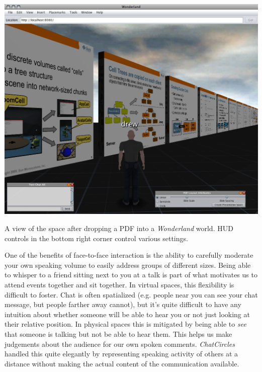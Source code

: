 \begin{marginfigure}[1.0in]
	\includegraphics{figures/pdf-spreader.png}
	\caption{A view of the space after dropping a PDF into a \emph{Wonderland} world. HUD controls in the bottom right corner control various settings.}
	\label{fig:pdf_spreader}
\end{marginfigure}

One of the benefits of face-to-face interaction is the ability to carefully moderate your own speaking volume to easily address groups of different sizes. Being able to whisper to a friend sitting next to you at a talk is part of what motivates us to attend events together and sit together. In virtual spaces, this flexibility is difficult to foster. Chat is often spatialized (e.g. people near you can see your chat message, but people farther away cannot), but it's quite difficult to have any intuition about whether someone will be able to hear you or not just looking at their relative position. In physical spaces this is mitigated by being able to \emph{see} that someone is talking but not be able to hear them. This helps us make judgements about the audience for our own spoken comments. \emph{ChatCircles} handled this quite elegantly by representing speaking activity of others at a distance without making the actual content of the communication available. \citep{Viegas:1999kv}

